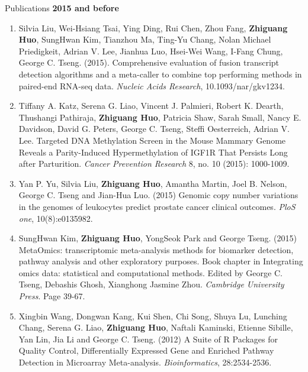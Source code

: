 \documentclass{resume} %
\begin{document}
\begin{rSection}{Publications}
\textbf{2015 and before}
\begin{enumerate}[noitemsep,topsep=0pt,resume]
    \item Silvia Liu, Wei-Hsiang Tsai, Ying Ding, Rui Chen, Zhou Fang, {\bf Zhiguang Huo}, SungHwan Kim, Tianzhou Ma, Ting-Yu Chang, Nolan Michael Priedigkeit, Adrian V. Lee, Jianhua Luo, Hsei-Wei Wang, I-Fang Chung, George C. Tseng. (2015).
Comprehensive evaluation of fusion transcript detection algorithms and a meta-caller to combine top performing methods in paired-end RNA-seq data.
\emph{Nucleic Acids Research}, 10.1093/nar/gkv1234.

    \item Tiffany A. Katz, Serena G. Liao, Vincent J. Palmieri, Robert K. Dearth, Thushangi Pathiraja, {\bf Zhiguang Huo}, Patricia Shaw, Sarah Small, Nancy E. Davidson, David G. Peters, George C. Tseng, Steffi Oesterreich, Adrian V. Lee. Targeted DNA Methylation Screen in the Mouse Mammary Genome Reveals a Parity-Induced Hypermethylation of IGF1R That Persists Long after Parturition. \emph{Cancer Prevention Research} 8, no. 10 (2015): 1000-1009.

    \item Yan P. Yu, Silvia Liu, {\bf Zhiguang Huo}, Amantha Martin, Joel B. Nelson, George C. Tseng and Jian-Hua Luo. (2015) Genomic copy number variations in the genomes of leukocytes predict prostate cancer clinical outcomes. \emph{PloS one}, 10(8):e0135982.

\item SungHwan Kim,  {\bf Zhiguang Huo}, YongSeok Park and George Tseng.  (2015) MetaOmics: transcriptomic meta-analysis methods for biomarker detection, pathway analysis and other exploratory purposes. Book chapter in Integrating omics data: statistical and computational methods. Edited by George C. Tseng, Debashis Ghosh, Xianghong Jasmine Zhou. \emph{Cambridge University Press}. Page 39-67.

    \item Xingbin Wang, Dongwan Kang, Kui Shen, Chi Song, Shuya Lu, Lunching Chang, Serena G. Liao, {\bf Zhiguang Huo}, Naftali Kaminski, Etienne Sibille, Yan Lin, Jia Li and George C. Tseng. (2012) A Suite of R Packages for Quality Control, Differentially Expressed Gene and Enriched Pathway Detection in Microarray Meta-analysis. \emph{Bioinformatics}, 28:2534-2536.

\end{enumerate}


\end{rSection}
\end{document}
